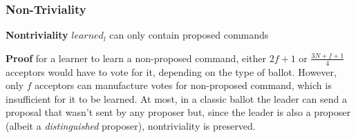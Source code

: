 \subsubsection{Non-Triviality}
\textbf{Nontriviality} $learned_l$ can only contain proposed commands\par
\textbf{Proof} for a learner to learn a non-proposed command, either $2f+1$ or $\frac{3N+f+1}{4}$ acceptors would have to vote for it, depending on the type of ballot. However, only $f$ acceptors can manufacture votes for non-proposed command, which is insufficient for it to be learned. At most, in a classic ballot the leader can send a proposal that wasn't sent by any proposer but, since the leader is also a proposer (albeit a \textit{distinguished} proposer), nontriviality is preserved.\par

